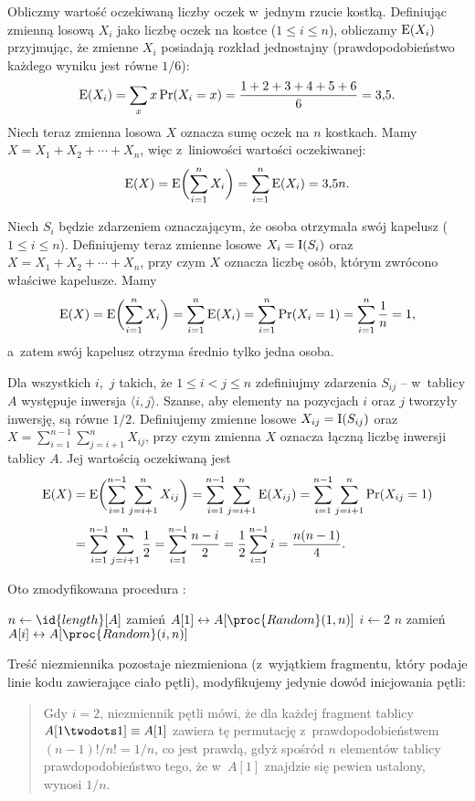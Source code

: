 \exercise %
Obliczmy wartość oczekiwaną liczby oczek w~jednym rzucie kostką. Definiując zmienną losową $X_i$ jako liczbę oczek na  kostce ($1\le i\le n$), obliczamy $\operatorname{E}(X_i)$ przyjmując, że zmienne $X_i$ posiadają rozkład jednostajny (prawdopodobieństwo każdego wyniku jest równe $1/6$):
\[
	\operatorname{E}(X_i) = \sum_xx\Pr(X_i=x) = \frac{1+2+3+4+5+6}{6} = 3{,}5.
\]
Niech teraz zmienna losowa $X$ oznacza sumę oczek na $n$ kostkach. Mamy $X=X_1+X_2+\cdots+X_n$, więc z~liniowości wartości oczekiwanej:
\[
	\operatorname{E}(X) = \operatorname{E}\biggl(\sum_{i=1}^nX_i\biggr) = \sum_{i=1}^n\operatorname{E}(X_i) = 3{,}5n.
\]

\exercise %
Niech $S_i$ będzie zdarzeniem oznaczającym, że  osoba otrzymała swój kapelusz ($1\le i\le n$). Definiujemy teraz zmienne losowe $X_i=\operatorname{I}(S_i)$ oraz $X=X_1+X_2+\cdots+X_n$, przy czym $X$ oznacza liczbę osób, którym zwrócono właściwe kapelusze. Mamy
\[
	\operatorname{E}(X) = \operatorname{E}\biggl(\sum_{i=1}^nX_i\biggr) = \sum_{i=1}^n\operatorname{E}(X_i) = \sum_{i=1}^n\Pr(X_i=1) = \sum_{i=1}^n\frac{1}{n} = 1,
\]
a~zatem swój kapelusz otrzyma średnio tylko jedna osoba.

\exercise %
Dla wszystkich $i$,~$j$ takich, że $1\le i<j\le n$ zdefiniujmy zdarzenia $S_{ij}$ -- w~tablicy $A$ występuje inwersja $\langle i,j\rangle$. Szanse, aby elementy na pozycjach $i$ oraz $j$ tworzyły inwersję, są równe $1/2$. Definiujemy zmienne losowe $X_{ij}=\operatorname{I}(S_{ij})$ oraz $X=\sum_{i=1}^{n-1}\sum_{j=i+1}^nX_{ij}$, przy czym zmienna $X$ oznacza łączną liczbę inwersji tablicy $A$. Jej wartością oczekiwaną jest
\begin{align*}
	\operatorname{E}(X) &= \operatorname{E}\biggl(\sum_{i=1}^{n-1}\sum_{j=i+1}^nX_{ij}\biggr) = \sum_{i=1}^{n-1}\sum_{j=i+1}^n\operatorname{E}(X_{ij}) = \sum_{i=1}^{n-1}\sum_{j=i+1}^n\Pr(X_{ij}=1) \\[1mm]
	&= \sum_{i=1}^{n-1}\sum_{j=i+1}^n\frac{1}{2} = \sum_{i=1}^{n-1}\frac{n-i}{2} = \frac{1}{2}\sum_{i=1}^{n-1}i = \frac{n(n-1)}{4}.
\end{align*}


\exercise %
Oto zmodyfikowana procedura :
\begin{codebox}
\li	$n\gets\id{length}[A]$
\li	zamień $A[1]\leftrightarrow A[\proc{Random}(1,n)]$
\li	\For $i\gets2$ \To $n$
\li		\Do zamień $A[i]\leftrightarrow A[\proc{Random}(i,n)]$
		\End
\end{codebox}
Treść niezmiennika pozostaje niezmieniona (z~wyjątkiem fragmentu, który podaje linie kodu zawierające ciało pętli), modyfikujemy jedynie dowód inicjowania pętli:
\begin{quote}
	Gdy $i=2$, niezmiennik pętli mówi, że dla każdej  fragment tablicy $A[1\twodots1]\equiv A[1]$ zawiera tę permutację z~prawdopodobieństwem $(n-1)!/n!=1/n$, co jest prawdą, gdyż spośród $n$ elementów tablicy prawdopodobieństwo tego, że w~$A[1]$ znajdzie się pewien ustalony, wynosi $1/n$.
\end{quote}

